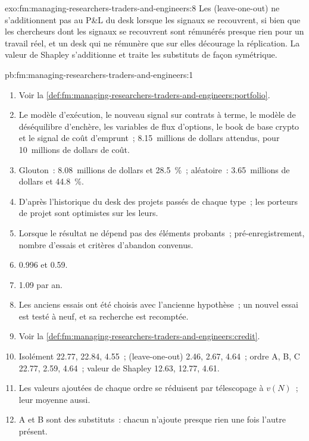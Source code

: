 \begin{solution}{exo:fm:managing-researchers-traders-and-engineers:8}
Les  (leave-one-out) ne s'additionnent pas au P\&L du desk lorsque les signaux se recouvrent, si bien que les chercheurs dont les signaux se recouvrent sont rémunérés presque rien pour un
travail réel, et un desk qui ne rémunère que sur elles décourage la réplication. La valeur de Shapley s'additionne et traite les substituts de façon symétrique.
\end{solution}

\begin{solution}{pb:fm:managing-researchers-traders-and-engineers:1}
\begin{enumerate}
\item Voir la \cref{def:fm:managing-researchers-traders-and-engineers:portfolio}.
\item Le modèle d'exécution, le nouveau signal sur contrats à terme, le modèle de déséquilibre d'enchère, les variables de flux d'options, le book de base crypto et le
signal de coût d'emprunt~; 8.15~millions de dollars attendus, pour 10~millions de dollars de coût.
\item Glouton~: 8.08~millions de dollars et 28.5~\%~; aléatoire~: 3.65~millions de dollars et 44.8~\%.
\item D'après l'historique du desk des projets passés de chaque type~; les porteurs de projet sont optimistes sur les leurs.
\item Lorsque le résultat ne dépend pas des éléments probants~; pré-enregistrement, nombre d'essais et critères d'abandon convenus.
\item 0.996 et 0.59.
\item 1.09 par an.
\item Les anciens essais ont été choisis avec l'ancienne hypothèse~; un nouvel essai est testé à neuf, et sa recherche est recomptée.
\item Voir la \cref{def:fm:managing-researchers-traders-and-engineers:credit}.
\item Isolément 22.77, 22.84, 4.55~;  (leave-one-out) 2.46, 2.67, 4.64~; ordre A, B, C 22.77, 2.59, 4.64~; valeur de Shapley 12.63, 12.77, 4.61.
\item Les valeurs ajoutées de chaque ordre se réduisent par télescopage à $v(N)$~; leur moyenne aussi.
\item A et B sont des substituts~: chacun n'ajoute presque rien une fois l'autre présent.

\end{enumerate}
\end{solution}
